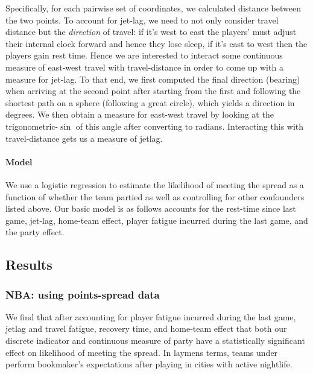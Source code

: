 \documentclass[letterpaper,12pt]{article}
\begin{document}
Specifically, for each pairwise set of coordinates, we calculated distance between the two
points.\citep{sp} To account for jet-lag, we need to not only consider travel distance
but the \emph{direction} of travel: if it's west to east the players' must adjust their internal
clock forward and hence they lose sleep, if it's east to west then the players gain rest time.
Hence we are interested to interact some continuous measure of east-west travel with
travel-distance in order to come up with a measure for jet-lag.
To that end, we first computed the final direction 
(bearing) when arriving at the 
second point after starting from the first and following the shortest path on a sphere 
(following a great circle), which yields a direction in degrees. 
We then obtain a measure for east-west travel by looking at the trigonometric-$\sin$ of this angle after converting to radians.
Interacting this with travel-distance gets us a measure of jetlag.\citep{lallensack}


\paragraph{Model} We use a logistic regression to estimate the likelihood of meeting
the spread as a function of whether the team partied as well as controlling for other confounders
listed above. Our basic model is as follows accounts for the rest-time since
last game, jet-lag, home-team effect, player fatigue incurred during the last game,
and the party effect.

\subsection{Results}
\subsubsection{NBA: using points-spread data}
We find that after accounting for player fatigue incurred during the last game, jetlag and travel fatigue, recovery time, and home-team effect that both our discrete indicator and continuous measure of party
have a statistically significant effect on likelihood of meeting the spread.
In laymens terms, teams under perform bookmaker's expectations after playing in cities 
with active nightlife.
\end{document}
